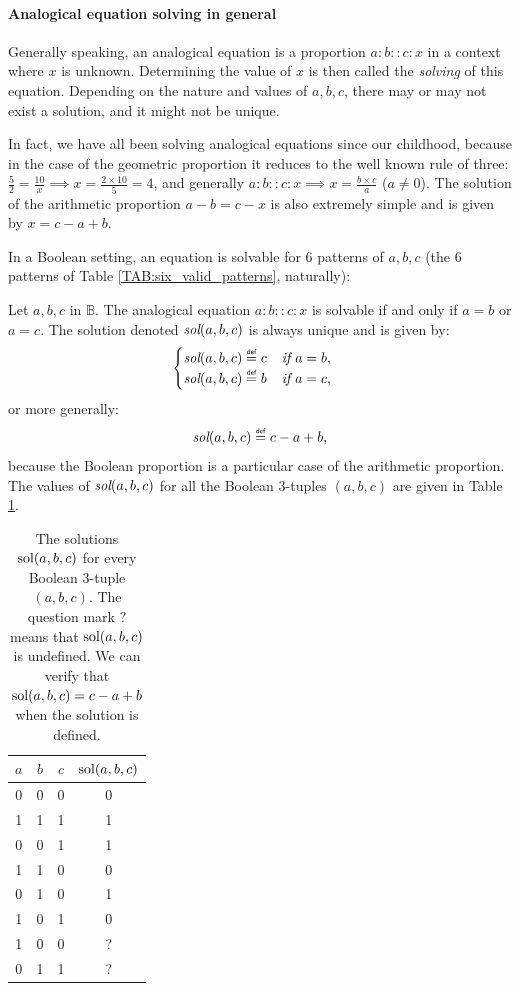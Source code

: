\paragraph{Analogical equation solving in general\\}

Generally speaking, an analogical equation is a proportion $a:b::c:x$ in a
context where $x$ is unknown. Determining the value of $x$ is then called the
\textit{solving} of this equation. Depending on the nature and values of $a, b,
c$, there may or may not exist a solution, and it might not be unique.

In fact, we have all been solving analogical equations since our childhood,
because in the case of the geometric proportion it reduces to the well known
rule of three: $\frac{5}{2} = \frac{10}{x} \implies x = \frac{2 \times 10}{5} =
4$, and generally $a:b::c:x \implies x = \frac{b \times c}{a}$ ($a \neq 0$).
The solution of the arithmetic proportion $a - b = c -x$ is also extremely
simple and is given by $x = c - a + b$.

In a Boolean setting, an equation is solvable for 6 patterns of $a, b, c$ (the
6 patterns of Table \ref{TAB:six_valid_patterns}, naturally):
\begin{proposition}
  \label{PROPOS:equation_solving}
  Let $a, b, c$ in $\mathbb{B}$. The analogical equation
  $a :b::c:x$
  is solvable if and only if $a = b$ or $a = c$. The solution denoted
  $\emph{sol}(a, b, c)$ is always unique and is given by:
  $$
  \begin{cases}
    \emph{sol}(a, b, c) \eqdef c \emph{~~ if } a = b,\\
    \emph{sol}(a, b, c) \eqdef b \emph{~~ if } a = c,
  \end{cases}
  $$
  or more generally:
  $$\emph{sol}(a, b, c) \eqdef c - a + b,$$
  because the Boolean proportion is a particular case of the arithmetic
  proportion. The values of $\emph{sol}(a, b, c)$ for all the Boolean $3$-tuples $(a,
  b, c)$ are given in Table \ref{TAB:solutions}.
\end{proposition}

\begin{table}[t]
  \centering
  \begin{tabular}[t]{cccc}
    \toprule
    $a$ & $b$ & $c$ & $\text{sol}(a, b, c)$ \\
    \midrule
    0 & 0 & 0 & 0 \\
    1 & 1 & 1 & 1 \\
    0 & 0 & 1 & 1 \\
    1 & 1 & 0 & 0 \\
    0 & 1 & 0 & 1 \\
    1 & 0 & 1 & 0 \\
    1 & 0 & 0 &?\\
    0 & 1 & 1 &?\\
    \bottomrule
  \end{tabular}
  \caption{The solutions $\text{sol}(a, b, c)$ for every Boolean $3$-tuple $(a, b,
  c)$. The question mark $?$ means that $\text{sol}(a, b, c)$ is undefined. We can
  verify that $\text{sol}(a, b, c) = c - a + b$ when the solution is defined.}
  \label{TAB:solutions}
\end{table}

